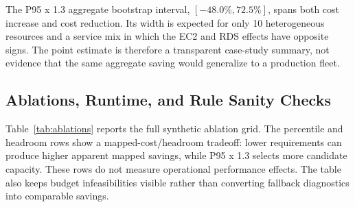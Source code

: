 \documentclass[11pt]{article}
\begin{document}


The P95 x 1.3 aggregate bootstrap interval,
$[-48.0\%,72.5\%]$, spans both cost increase and cost reduction. Its width is
expected for only 10 heterogeneous resources and a service mix in which the
EC2 and RDS effects have opposite signs. The point estimate is therefore a
transparent case-study summary, not evidence that the same aggregate saving
would generalize to a production fleet.

\subsection{Ablations, Runtime, and Rule Sanity Checks}

Table~\ref{tab:ablations} reports the full synthetic ablation grid. The
percentile and headroom rows show a mapped-cost/headroom tradeoff: lower
requirements can produce higher apparent mapped savings, while P95 x 1.3
selects more candidate capacity. These rows do not measure operational
performance effects. The table also keeps
budget infeasibilities visible rather than converting fallback diagnostics
into comparable savings.
\end{document}
